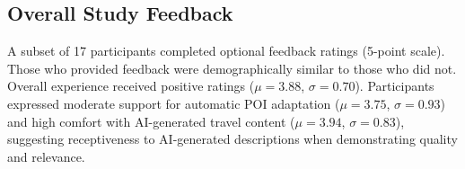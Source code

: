 \subsection{Overall Study Feedback}
A subset of 17 participants completed optional feedback ratings (5-point scale). Those who provided feedback were demographically similar to those who did not. Overall experience received positive ratings ($\mu = 3.88$, $\sigma = 0.70$). Participants expressed moderate support for automatic POI adaptation ($\mu = 3.75$, $\sigma = 0.93$) and high comfort with AI-generated travel content ($\mu = 3.94$, $\sigma = 0.83$), suggesting receptiveness to AI-generated descriptions when demonstrating quality and relevance.

